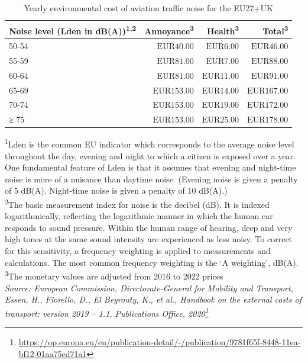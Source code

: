 \documentclass[
  11pt,
  a4paper,
]{book}
\DeclareRobustCommand{\href}[2]{#2\footnote{\url{#1}}}
\begin{document}
\hypertarget{tbl-yearly-noise-cost}{}
\setlength{\LTpost}{0mm}
\begin{longtable}{lrrr}
\caption{\label{tbl-yearly-noise-cost}Yearly environmental cost of aviation traffic noise for the EU27+UK }\tabularnewline

\toprule
Noise level (Lden in dB(A))\textsuperscript{1,2} & Annoyance\textsuperscript{3} & Health\textsuperscript{3} & Total\textsuperscript{3} \\ 
\midrule
50‑54 & $\text{EUR}40.00$ & $\text{EUR}6.00$ & $\text{EUR}46.00$ \\ 
55‑59 & $\text{EUR}81.00$ & $\text{EUR}7.00$ & $\text{EUR}88.00$ \\ 
60‑64 & $\text{EUR}81.00$ & $\text{EUR}11.00$ & $\text{EUR}91.00$ \\ 
65‑69 & $\text{EUR}153.00$ & $\text{EUR}14.00$ & $\text{EUR}167.00$ \\ 
70‑74 & $\text{EUR}153.00$ & $\text{EUR}19.00$ & $\text{EUR}172.00$ \\ 
≥ 75 & $\text{EUR}153.00$ & $\text{EUR}25.00$ & $\text{EUR}178.00$ \\ 
\bottomrule
\end{longtable}
\begin{minipage}{\linewidth}
\textsuperscript{1}Lden is the common EU indicator which corresponds to the average noise level throughout the day, evening and night to which a citizen is exposed over a year. One fundamental feature of Lden is that it assumes that evening and night-time noise is more of a nuisance than daytime noise.     (Evening noise is given a penalty of 5 dB(A). Night-time noise is given a penalty of 10 dB(A).)\\
\textsuperscript{2}The basic measurement index for noise is the decibel (dB). It is indexed logarithmically, reflecting the logarithmic manner in which the human ear responds to sound pressure. Within the human range of hearing, deep and very high tones at the same sound intensity are experienced as less noisy. To correct for this sensitivity, a frequency weighting is applied to measurements and calculations.  The most common frequency weighting is the ‘A weighting’, dB(A).\\
\textsuperscript{3}The monetary values are adjusted from 2016 to 2022 prices\\
\emph{Source: \href{https://op.europa.eu/en/publication-detail/-/publication/9781f65f-8448-11ea-bf12-01aa75ed71a1}{European Commission, Directorate-General for Mobility and Transport, Essen, H., Fiorello, D., El Beyrouty, K., et al., Handbook on the external costs of transport: version 2019 -- 1.1, Publications Office, 2020}}\\
\end{minipage}
\end{document}
